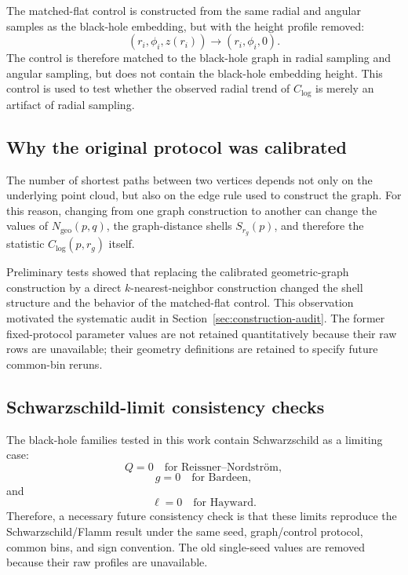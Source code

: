 \documentclass[11pt,a4paper]{article}
\begin{document}
The matched-flat control is constructed from the same radial and angular samples as the black-hole embedding, but with the height profile removed:
\begin{equation}
    (r_i,\phi_i,z(r_i))
    \longrightarrow
    (r_i,\phi_i,0).
\end{equation}
The control is therefore matched to the black-hole graph in radial sampling and angular sampling, but does not contain the black-hole embedding height. This control is used to test whether the observed radial trend of $C_{\log}$ is merely an artifact of radial sampling.

\subsection{Why the original protocol was calibrated}

The number of shortest paths between two vertices depends not only on the underlying point cloud, but also on the edge rule used to construct the graph. For this reason, changing from one graph construction to another can change the values of $N_{\mathrm{geo}}(p,q)$, the graph-distance shells $S_{r_g}(p)$, and therefore the statistic $C_{\log}(p,r_g)$ itself.

Preliminary tests showed that replacing the calibrated geometric-graph construction by a direct $k$-nearest-neighbor construction changed the shell structure and the behavior of the matched-flat control. This observation motivated the systematic audit in Section~\ref{sec:construction-audit}. The former fixed-protocol parameter values are not retained quantitatively because their raw rows are unavailable; their geometry definitions are retained to specify future common-bin reruns.

\subsection{Schwarzschild-limit consistency checks}

The black-hole families tested in this work contain Schwarzschild as a limiting case:
\begin{equation}
    Q=0
    \quad
    \text{for Reissner--Nordstr\"om},
\end{equation}
\begin{equation}
    g=0
    \quad
    \text{for Bardeen},
\end{equation}
and
\begin{equation}
    \ell=0
    \quad
    \text{for Hayward}.
\end{equation}
Therefore, a necessary future consistency check is that these limits reproduce the Schwarzschild/\allowbreak Flamm result under the same seed, graph/control protocol, common bins, and sign convention. The old single-seed values are removed because their raw profiles are unavailable.
\end{document}
